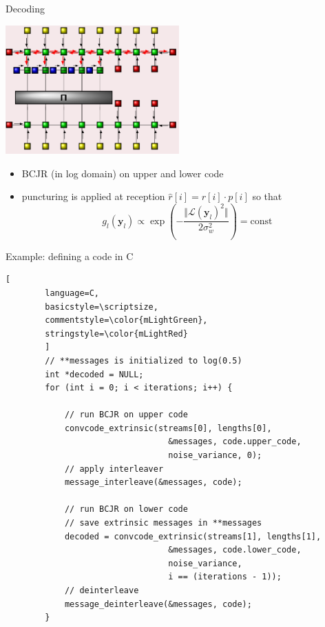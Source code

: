 \documentclass[xcolor={usenames,dvipsnames},11pt]{beamer}
\begin{document}
\begin{frame}[c]{Decoding}
    \begin{center}
        \includegraphics[width=0.5\textwidth]{./images/decoding.png}
    \end{center}
    \begin{itemize}
        \item BCJR (in log domain) on upper and lower code
        \item puncturing is applied at reception 
            $\hat{r}[i] = r[i]\cdot p[i]$ so that
            \[
                g_l(\mathbf{y}_l) \propto \exp\left( -\frac{\Vert \mathcal{L}(\mathbf{y}_l)^2\Vert}{2\sigma_w^2} \right) = \text{const}
            \]
    \end{itemize}
    
\end{frame}
\begin{frame}[c,fragile]{Example: defining a code in C}
    \begin{lstlisting}[
        language=C,
        basicstyle=\scriptsize,
        commentstyle=\color{mLightGreen},
        stringstyle=\color{mLightRed}
        ]
        // **messages is initialized to log(0.5)
        int *decoded = NULL;
        for (int i = 0; i < iterations; i++) {

            // run BCJR on upper code
            convcode_extrinsic(streams[0], lengths[0], 
                                 &messages, code.upper_code,
                                 noise_variance, 0);
            // apply interleaver
            message_interleave(&messages, code);

            // run BCJR on lower code
            // save extrinsic messages in **messages
            decoded = convcode_extrinsic(streams[1], lengths[1], 
                                 &messages, code.lower_code, 
                                 noise_variance, 
                                 i == (iterations - 1));
            // deinterleave
            message_deinterleave(&messages, code);
        }
    \end{lstlisting}
\end{frame}
\end{document}
